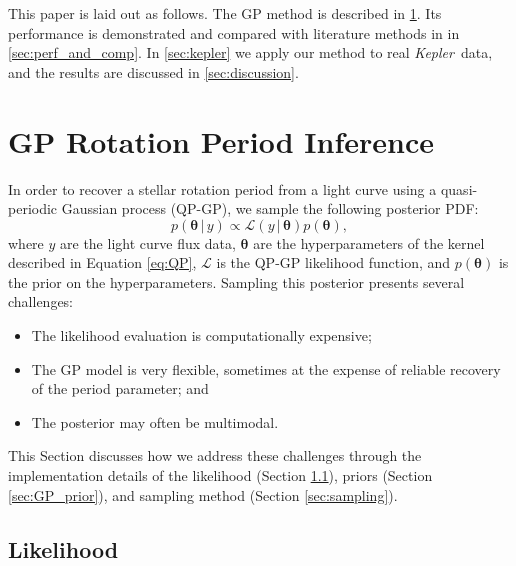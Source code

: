 \documentclass[useAMS, usenatbib, preprint, 12pt]{aastex}
\newcommand{\Kepler}{{\it Kepler}}
\newcommand{\kepler}{\Kepler}
\begin{document}
This paper is laid out as follows.
The GP method is described in \textsection \ref{sec:method}.
Its performance is demonstrated and compared with literature methods in
in \textsection \ref{sec:perf_and_comp}.
In \textsection \ref{sec:kepler} we apply our method to real \kepler\ data,
and the results are discussed in \textsection \ref{sec:discussion}.

\section{GP Rotation Period Inference}
\label{sec:method}

In order to recover a stellar rotation period from a light curve using a
quasi-periodic Gaussian process (QP-GP), we sample the following posterior
PDF:
\begin{equation}
\label{eq:posterior}
p({\bm \theta}\,|\,y) \propto \mathcal L(y\,|\,{\bm \theta}) p({\bm \theta}),
\end{equation}
where $y$ are the light curve flux data, $\bm \theta$ are the hyperparameters
of the kernel described in Equation \ref{eq:QP}, $\mathcal L$ is the
QP-GP likelihood function, and $p({\bm \theta})$ is the prior on the
hyperparameters.  Sampling this posterior presents several challenges:
\begin{itemize}
    \item The likelihood evaluation is computationally expensive;
    \item The GP model is very flexible, sometimes at the expense of
    reliable recovery of the period parameter; and
    \item The posterior may often be multimodal.
\end{itemize}
This Section discusses how we address these challenges through
the implementation details of the likelihood (Section \ref{sec:GP_lhood}), priors
(Section \ref{sec:GP_prior}), and sampling method (Section \ref{sec:sampling}).

\subsection{Likelihood}
\label{sec:GP_lhood}
\end{document}
